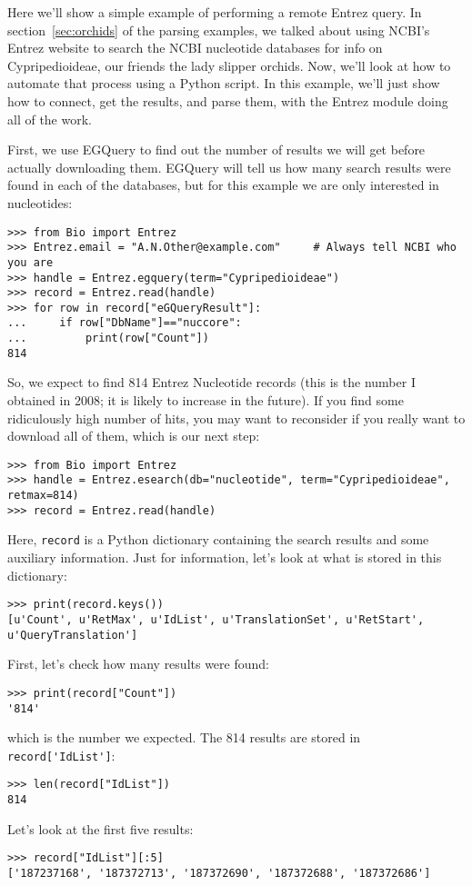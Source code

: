 \documentclass{report}
\begin{document}
Here we'll show a simple example of performing a remote Entrez query. In section~\ref{sec:orchids} of the parsing examples, we talked about using NCBI's Entrez website to search the NCBI nucleotide databases for info on Cypripedioideae, our friends the lady slipper orchids. Now, we'll look at how to automate that process using a Python script. In this example, we'll just show how to connect, get the results, and parse them, with the Entrez module doing all of the work.

First, we use EGQuery to find out the number of results we will get before actually downloading them.  EGQuery will tell us how many search results were found in each of the databases, but for this example we are only interested in nucleotides:
\begin{verbatim}
>>> from Bio import Entrez
>>> Entrez.email = "A.N.Other@example.com"     # Always tell NCBI who you are
>>> handle = Entrez.egquery(term="Cypripedioideae")
>>> record = Entrez.read(handle)
>>> for row in record["eGQueryResult"]:
...     if row["DbName"]=="nuccore":
...         print(row["Count"])
814
\end{verbatim}

So, we expect to find 814 Entrez Nucleotide records (this is the number I obtained in 2008; it is likely to increase in the future). If you find some ridiculously high number of hits, you may want to reconsider if you really want to download all of them, which is our next step:
\begin{verbatim}
>>> from Bio import Entrez
>>> handle = Entrez.esearch(db="nucleotide", term="Cypripedioideae", retmax=814)
>>> record = Entrez.read(handle)
\end{verbatim}

Here, \verb+record+ is a Python dictionary containing the search results and some auxiliary information. Just for information, let's look at what is stored in this dictionary:
\begin{verbatim}
>>> print(record.keys())
[u'Count', u'RetMax', u'IdList', u'TranslationSet', u'RetStart', u'QueryTranslation']
\end{verbatim}
First, let's check how many results were found:
\begin{verbatim}
>>> print(record["Count"])
'814'
\end{verbatim}
which is the number we expected. The 814 results are stored in \verb+record['IdList']+:
\begin{verbatim}
>>> len(record["IdList"])
814
\end{verbatim}
Let's look at the first five results:
\begin{verbatim}
>>> record["IdList"][:5]
['187237168', '187372713', '187372690', '187372688', '187372686']
\end{verbatim}
\end{document}
